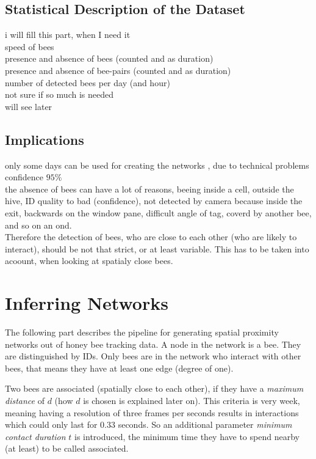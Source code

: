 \subsection{Statistical Description of the Dataset}
i will fill this part, when I need it\\
speed of bees\\
presence and absence of bees (counted and as duration)\\
presence and absence of bee-pairs (counted and as duration)\\
number of detected bees per day (and hour)\\ 
not sure if so much is needed\\
will see later\\


\subsection{Implications}
only some days can be used for creating the networks , due to technical problems\\
confidence $95\%$\\
the absence of bees can have a lot of reasons, beeing inside a cell, outside the hive, ID quality to bad (confidence), not detected by camera because inside the exit, backwards on the window pane, difficult angle of tag, coverd by another bee, and so on an ond.\\
Therefore the detection of bees, who are close to each other (who are likely to interact), should be not that strict, or at least variable. This has to be taken into acoount, when looking at spatialy close bees.\\


\section{Inferring Networks}

The following part describes the pipeline for generating spatial proximity networks out of honey bee tracking data. A node in the network is a bee. They are distinguished by IDs. Only bees are in the network who interact with other bees, that means they have at least one edge (degree of one).


Two bees are associated (spatially close to each other), if they have a \emph{maximum distance} of $d$ (how $d$ is chosen is explained later on). This criteria is very week, meaning having a resolution of three frames per seconds results in interactions which could only last for $0.33$ seconds. So an additional parameter \emph{minimum contact duration} $t$ is introduced, the minimum time they have to spend nearby (at least) to be called associated.


